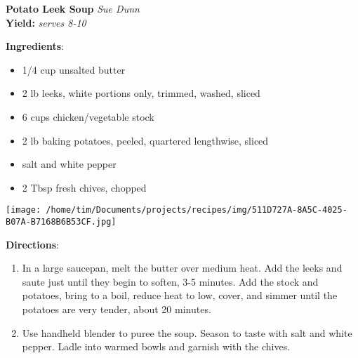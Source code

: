 \documentclass[11pt, twoside, openany]{book}
\begin{document}
\noindent\begin{minipage}[t]{\linewidth}%
{\Large\textbf{Potato Leek Soup}} \label{potato-leek-soup}\hfill\textit{Sue Dunn}\\
\textbf{Yield:} \textit{serves 8-10}\\
\noindent\begin{minipage}[t]{0.78\linewidth}%
\textbf{Ingredients}:\vspace{-3mm}
\begin{multicols}{2}
\begin{itemize}\setlength\itemsep{-1mm}
\item 1/4 cup unsalted butter
\item 2 lb leeks, white portions only, trimmed, washed, sliced
\item 6 cups chicken/vegetable stock
\item 2 lb baking potatoes, peeled, quartered lengthwise, sliced
\item salt and white pepper
\item 2 Tbsp fresh chives, chopped
\end{itemize}
\end{multicols}
\end{minipage}
\noindent\begin{minipage}[t]{0.18\linewidth}
\centering \strut\vspace*{-\baselineskip}\newline
\texttt{[image: /home/tim/Documents/projects/recipes/img/511D727A-8A5C-4025-B07A-B7168B6B53CF.jpg]}\\
\end{minipage}\vspace{3mm}
\textbf{Directions}:
\vspace{-3mm}\begin{enumerate}\setlength\itemsep{-1mm}
\item In a large saucepan, melt the butter over medium heat. Add the leeks and saute just until they begin to soften, 3-5 minutes. Add the stock and potatoes, bring to a boil, reduce heat to low, cover, and simmer until the potatoes are very tender, about 20 minutes. 
\item Use handheld blender to puree the soup. Season to taste with salt and white pepper. Ladle into warmed bowls and garnish with the chives.
\end{enumerate}
\end{minipage}\vspace{8mm}
\end{document}
